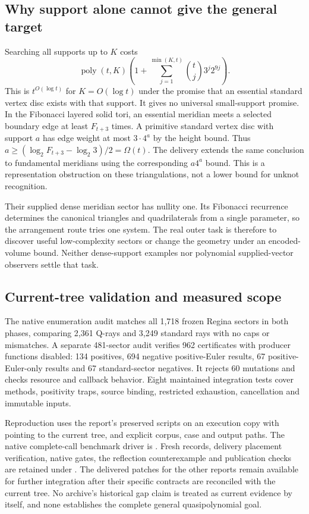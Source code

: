 \subsection{Why support alone cannot give the general target}

Searching all supports up to $K$ costs
\[
 \operatorname{poly}(t,K)\left(1+\sum_{j=1}^{\min(K,t)}
                 \binom tj3^j2^{9j}\right).
\]
This is $t^{O(\log t)}$ for $K=O(\log t)$ under the promise that an essential
standard vertex disc exists with that support. It gives no universal
small-support promise. In the Fibonacci layered solid tori, an essential
meridian meets a selected boundary edge at least $F_{t+3}$ times. A primitive
standard vertex disc with support $a$ has edge weight at most $3\cdot4^a$
by the height bound. Thus $a\ge(\log_2 F_{t+3}-\log_2 3)/2=\Omega(t)$.
The delivery extends the same conclusion to fundamental meridians using
the corresponding $a4^a$ bound. This is a representation obstruction on
these triangulations, not a lower bound for unknot recognition.

Their supplied dense meridian sector has nullity one. Its Fibonacci
recurrence determines the canonical triangles and quadrilaterals from a
single parameter, so the arrangement route tries one system. The real
outer task is therefore to discover useful low-complexity sectors or change
the geometry under an encoded-volume bound. Neither dense-support examples
nor polynomial supplied-vector observers settle that task.

\subsection{Current-tree validation and measured scope}

The native enumeration audit matches all 1,718 frozen Regina sectors in
both phases, comparing 2,361 Q-rays and 3,249 standard rays with no caps
or mismatches. A separate 481-sector audit verifies 962 certificates with
producer functions disabled: 134 positives, 694 negative positive-Euler
results, 67 positive-Euler-only results and 67 standard-sector negatives.
It rejects 60 mutations and checks resource and callback behavior. Eight
maintained integration tests cover methods, positivity traps, source binding,
restricted exhaustion, cancellation and immutable inputs.


Reproduction uses the report's preserved scripts on an execution copy with
 pointing to the current tree, and explicit corpus, case and
output paths. The native complete-call benchmark driver is
. Fresh records, delivery
placement verification, native gates, the reflection counterexample and
publication checks are retained under .
The delivered patches for the other reports remain available for further
integration after their specific contracts are reconciled with the current
tree. No archive's historical gap claim is treated as current evidence by
itself, and none establishes the complete general quasipolynomial goal.
